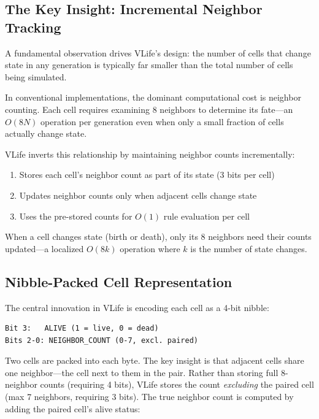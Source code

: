 \documentclass[11pt]{article}
\theoremstyle{definition}
\begin{document}
    \subsection{The Key Insight: Incremental Neighbor Tracking}

    A fundamental observation drives VLife's design: the number of cells that change state in any generation is typically far smaller than the total number of cells being simulated.

    In conventional implementations, the dominant computational cost is neighbor counting. Each cell requires examining 8 neighbors to determine its fate---an $O(8N)$ operation per generation even when only a small fraction of cells actually change state.

    VLife inverts this relationship by maintaining neighbor counts incrementally:

    \begin{enumerate}
        \item Stores each cell's neighbor count as part of its state (3 bits per cell)
        \item Updates neighbor counts only when adjacent cells change state
        \item Uses the pre-stored counts for $O(1)$ rule evaluation per cell
    \end{enumerate}

    When a cell changes state (birth or death), only its 8 neighbors need their counts updated---a localized $O(8k)$ operation where $k$ is the number of state changes.

    \subsection{Nibble-Packed Cell Representation}

    The central innovation in VLife is encoding each cell as a 4-bit nibble:

    \begin{verbatim}
Bit 3:   ALIVE (1 = live, 0 = dead)
Bits 2-0: NEIGHBOR_COUNT (0-7, excl. paired)
    \end{verbatim}

    Two cells are packed into each byte. The key insight is that adjacent cells share one neighbor---the cell next to them in the pair. Rather than storing full 8-neighbor counts (requiring 4 bits), VLife stores the count \emph{excluding} the paired cell (max 7 neighbors, requiring 3 bits). The true neighbor count is computed by adding the paired cell's alive status:
\end{document}
